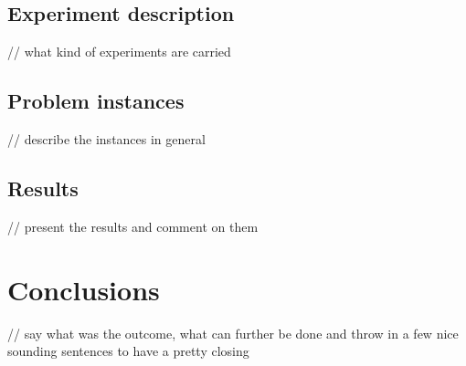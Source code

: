 \documentclass{article}
\theoremstyle{definition}
\begin{document}
\subsection{Experiment description}
// what kind of experiments are carried

\subsection{Problem instances}
// describe the instances in general

\subsection{Results}
// present the results and comment on them


\section{Conclusions}
// say what was the outcome, what can further be done and throw in a few nice sounding sentences to have a pretty closing




\end{document}
